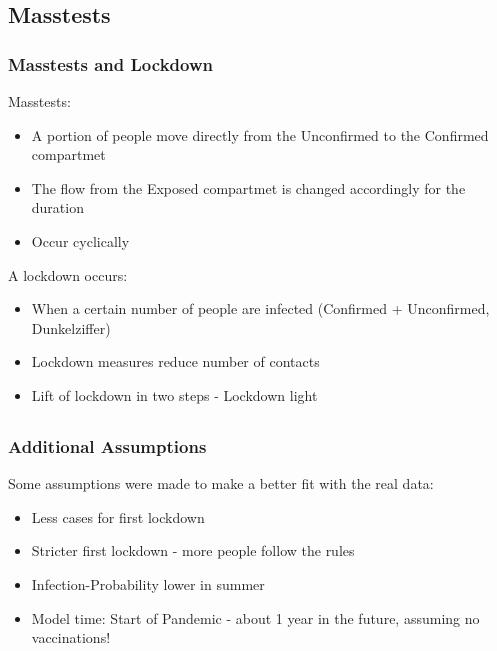 \documentclass{beamer}
\begin{document}

\subsection{Masstests}
\begin{frame}
\frametitle{Masstests and Lockdown}
Masstests:

\begin{itemize}
  \item A portion of people move directly from the Unconfirmed to the Confirmed compartmet
  \item The flow from the Exposed compartmet is changed accordingly for the duration
  \item Occur cyclically
\end{itemize}

A lockdown occurs:
\begin{itemize}
  \item When a certain number of people are infected (Confirmed + Unconfirmed, \glqq Dunkelziffer\grqq)
  \item Lockdown measures reduce number of contacts
  \item Lift of lockdown in two steps - \glqq Lockdown light\grqq
\end{itemize}
\end{frame}



\subsection{}
\begin{frame}
\frametitle{Additional Assumptions}
Some assumptions were made to make a better fit with the real data:

\begin{itemize}
  \item Less cases for first lockdown
  \item Stricter first lockdown - more people follow the rules
  \item Infection-Probability lower in summer
  \item Model time: Start of Pandemic - about 1 year in the future, assuming no vaccinations!
\end{itemize}
\end{frame}

\end{document}
